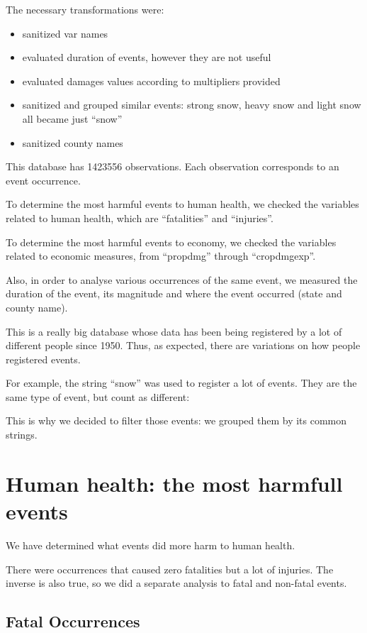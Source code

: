 \documentclass[]{article}
\providecommand{\tightlist}{%
  \setlength{\itemsep}{0pt}\setlength{\parskip}{0pt}}
\begin{document}
The necessary transformations were:

\begin{itemize}
\tightlist
\item
  sanitized var names
\item
  evaluated duration of events, however they are not useful
\item
  evaluated damages values according to multipliers provided
\item
  sanitized and grouped similar events: strong snow, heavy snow and
  light snow all became just ``snow''
\item
  sanitized county names
\end{itemize}

This database has 1423556 observations. Each observation corresponds to
an event occurrence.

To determine the most harmful events to human health, we checked the
variables related to human health, which are ``fatalities'' and
``injuries''.

To determine the most harmful events to economy, we checked the
variables related to economic measures, from ``propdmg'' through
``cropdmgexp''.

Also, in order to analyse various occurrences of the same event, we
measured the duration of the event, its magnitude and where the event
occurred (state and county name).

This is a really big database whose data has been being registered by a
lot of different people since 1950. Thus, as expected, there are
variations on how people registered events.

For example, the string ``snow'' was used to register a lot of events.
They are the same type of event, but count as different:

This is why we decided to filter those events: we grouped them by its
common strings.

\section{Human health: the most harmfull
events}\label{human-health-the-most-harmfull-events}

We have determined what events did more harm to human health.

There were occurrences that caused zero fatalities but a lot of
injuries. The inverse is also true, so we did a separate analysis to
fatal and non-fatal events.

\subsection{Fatal Occurrences}\label{fatal-occurrences}
\end{document}
